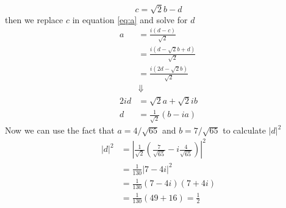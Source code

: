 \documentclass[11pt]{article}
\numberwithin{equation}{section}
\begin{document}
\begin{enumerate}[(a)]
$$c = \sqrt{2}b -d$$
then we replace $c$ in equation \ref{eq:a} and solve for $d$
\begin{align*}
a &= \frac{i(d-c)}{\sqrt{2}}\\
&= \frac{i(d - \sqrt{2}b + d)}{\sqrt{2}}\\
&= \frac{i(2d - \sqrt{2}b)}{\sqrt{2}}\\
&\Downarrow\\
2id &= \sqrt{2}a + \sqrt{2}ib\\
d &= \frac{1}{\sqrt{2}}(b-ia)
\end{align*}
Now we can use the fact that $a = 4/\sqrt{65}$ and $b = 7/\sqrt{65}$ to calculate $|d|^2$
\begin{align*}
|d|^2 &= \left|\frac{1}{\sqrt{2}}\left(\frac{7}{\sqrt{65}}-i\frac{4}{\sqrt{65}}\right)\right|^2\\
&= \frac{1}{130}|7-4i|^2\\
&= \frac{1}{130}(7-4i)(7+4i)\\
&= \frac{1}{130}(49+16) = \frac{1}{2}
\end{align*}
\end{enumerate}
\end{document}
